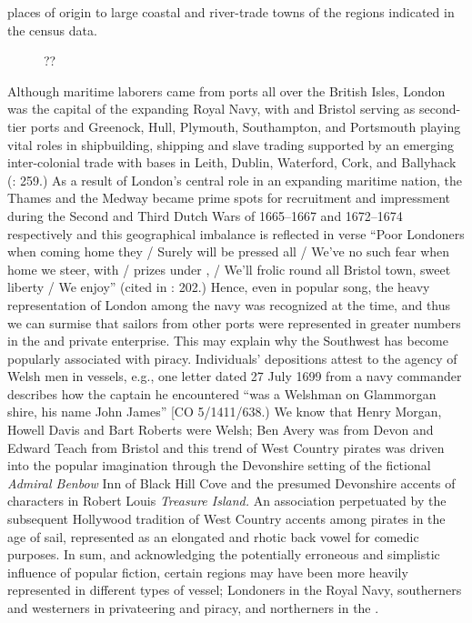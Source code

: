 places of origin to large coastal and river-trade towns of the regions indicated in the census data. 

\begin{figure}
 \caption{??}
\label{fig:key:3.2}
\end{figure}

Although maritime laborers came from ports all over the British Isles, London was the capital of the expanding Royal Navy, with  and Bristol serving as second-tier ports and Greenock, Hull, Plymouth, Southampton, and Portsmouth playing vital roles in shipbuilding,  shipping and slave trading supported by an emerging inter-colonial trade with bases in Leith, Dublin, Waterford, Cork, and Ballyhack (\citealt{Jarvis2010}: 259.) As a result of London’s central role in an expanding maritime nation, the Thames and the Medway became prime spots for recruitment and impressment during the Second and Third Dutch Wars of 1665--1667 and 1672--1674 respectively \citep[201,]{Earle1998} and this geographical imbalance is reflected in verse “Poor Londoners when coming home they / Surely will be pressed all / We’ve no such fear when home we steer, with / prizes under , / We’ll frolic round all Bristol town, sweet liberty / We enjoy” (cited in \citealt{Earle1998}: 202.) Hence, even in popular song, the heavy representation of London among the navy was recognized at the time, and thus we can surmise that sailors from other ports were represented in greater numbers in the  and private enterprise. This may explain why the Southwest has become popularly associated with piracy. Individuals’ depositions attest to the agency of Welsh men in  vessels, e.g., one letter dated 27 July {1699} from a navy commander describes how the  captain he encountered “was a Welshman on Glammorgan shire, his name John James” [CO 5/1411/638.) We know that Henry Morgan, Howell Davis and Bart Roberts were Welsh; Ben Avery was from Devon and Edward Teach from Bristol \citep[328,]{Bicheno2012} and this trend of West Country pirates was driven into the popular imagination through the Devonshire setting of the fictional \textit{Admiral Benbow} Inn of Black Hill Cove and the presumed Devonshire accents of characters in Robert Louis  \textit{Treasure Island.} An association perpetuated by the subsequent Hollywood tradition of West Country accents among pirates in the age of sail, represented as an elongated and rhotic back vowel for comedic purposes. In sum, and acknowledging the potentially erroneous and simplistic influence of popular fiction, certain regions may have been more heavily represented in different types of vessel; Londoners in the Royal Navy, southerners and westerners in privateering and piracy, and northerners in the . 

